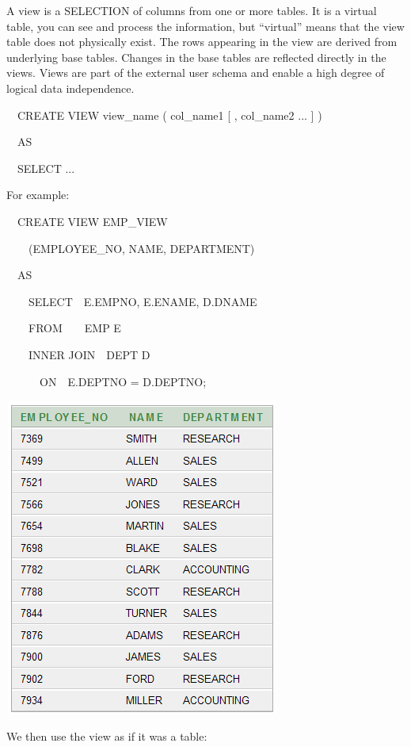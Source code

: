 A view is a SELECTION of columns from one or more tables.  It is a {\textquotedbl}virtual{\textquotedbl} table, you can see and process the information, but ``virtual'' means that the view table does not physically exist.  The rows appearing in the view are derived from underlying base tables.  Changes in the base tables are reflected directly in the views.  Views are part of the external user schema and enable a high degree of logical data independence.

\ \ CREATE VIEW view\_name ( col\_name1 [ , col\_name2 ... ] )

\ \ AS 

\ \ SELECT ...

For example:

\ \ CREATE VIEW EMP\_VIEW

\ \ \ \ (EMPLOYEE\_NO, NAME, DEPARTMENT)

\ \ AS

\ \ \ \ SELECT\ \ E.EMPNO, E.ENAME, D.DNAME

\ \ \ \ FROM\ \ \ \ EMP E

\ \ \ \ INNER JOIN\ \ DEPT D

\ \ \ \ \ \ ON\ \ E.DEPTNO = D.DEPTNO;



\begin{center}
  
\includegraphics[width=9.063cm,height=10.472cm]{images/img (50).png}

\end{center}
We then use the view as if it was a table:

